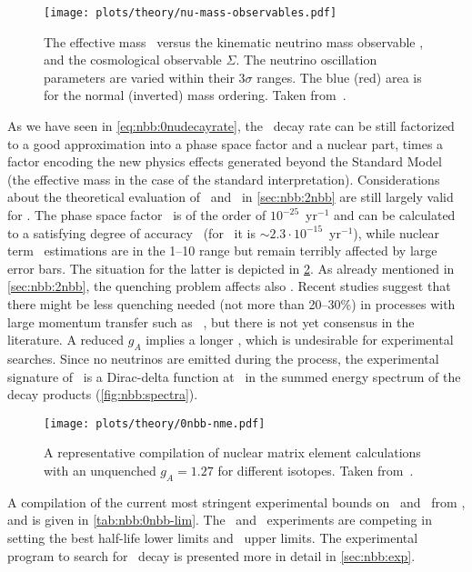\begin{figure}
  \centering
  \texttt{[image: plots/theory/nu-mass-observables.pdf]}
  \caption{%
    The effective mass \mbb\ versus the kinematic neutrino mass observable
    \mb, and the cosmological observable $\Sigma$. The neutrino
    oscillation parameters are varied within their $3\sigma$ ranges. The blue
    (red) area is for the normal (inverted) mass ordering. Taken
    from~\cite{Dolinski2019}.
  }\label{fig:nbb:mass-obs}
\end{figure}

As we have seen in \cref{eq:nbb:0nudecayrate}, the \onbb\ decay rate can be still
factorized to a good approximation into a phase space factor and a nuclear part, times a
factor encoding the new physics effects generated beyond the Standard Model (the effective
mass in the case of the standard interpretation). Considerations about the theoretical
evaluation of \psft\ and \nmet\ in \cref{sec:nbb:2nbb} are still largely valid for \onbb.
The phase space factor \psfz\ is of the order of $10^{-25}$~yr$^{-1}$ and can be
calculated to a satisfying degree of accuracy~\cite{Kotila2012, Stoica2013} (for \gesix\
it is ${\sim}2.3 \cdot 10^{-15}$~yr$^{-1}$), while nuclear term \nmez\ estimations are in
the 1--10 range but remain terribly affected by large error bars. The situation for the
latter is depicted in \cref{fig:nbb:nme}. As already mentioned in \cref{sec:nbb:2nbb}, the
quenching problem affects also \onbb. Recent studies suggest that there might be less
quenching needed (not more than 20--30\%) in processes with large momentum transfer such
as \onbb~\cite{?}, but there is not yet consensus in the literature. A reduced $g_A$
implies a longer \thalfzero, which is undesirable for experimental searches.  Since no
neutrinos are emitted during the process, the experimental signature of \onbb\ is a
Dirac-delta function at \qbb\ in the summed energy spectrum of the decay products
(\cref{fig:nbb:spectra}).

\begin{figure}
  \centering
  \texttt{[image: plots/theory/0nbb-nme.pdf]}
  \caption{%
    A representative compilation of nuclear matrix element calculations with an unquenched
    $g_A=1.27$ for different isotopes. Taken from~\cite{Yao2020}. \fillme{replace this
    with plot in \cite{Engel2017}?}
  }\label{fig:nbb:nme}
\end{figure}

A compilation of the current most stringent experimental bounds on \thalfzero\ and \mbb\
from \gesix,  and  is given in \cref{tab:nbb:0nbb-lim}. The \gerda\
and \kamlandzen\ experiments are competing in setting the best half-life lower limits and
\mbb\ upper limits. The experimental program to search for \onbb\ decay is presented more
in detail in \cref{sec:nbb:exp}.

